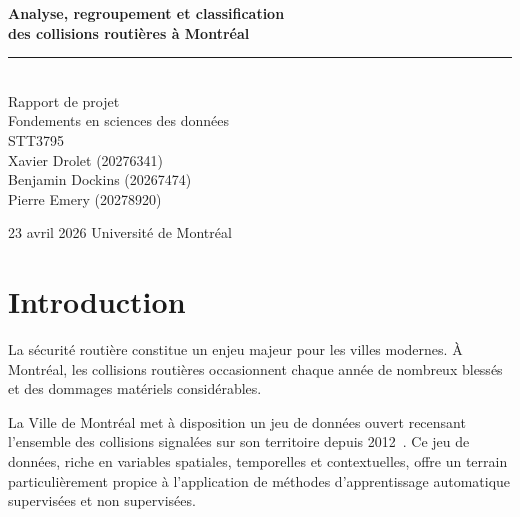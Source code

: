 \documentclass[12pt]{article}
\begin{document}
 
\begin{titlepage}
  \centering
  \vspace*{2cm}
  {\LARGE \textbf{Analyse, regroupement et classification\\
  des collisions routières à Montréal}\\[0.5em]}
  \rule{\linewidth}{0.4pt}\\[1.5em]
  {\large Rapport de projet}\\[1em]
  {\large Fondements en sciences des données}\\[2em]
  {\large  STT3795}\\[2em]

  {\large
  Xavier Drolet (20276341)\\
  Benjamin Dockins (20267474)\\
  Pierre Emery (20278920)\\[2em]}
 
  {\large 23 avril 2026}
  \vfill
  {\large Université de Montréal}
\end{titlepage}
 
\tableofcontents
\newpage
 
\section{Introduction}
 
%
 
La sécurité routière constitue un enjeu majeur pour les villes modernes.
À Montréal, les collisions routières occasionnent chaque année de nombreux
blessés et des dommages matériels considérables.
 
La Ville de Montréal met à disposition un jeu de données ouvert recensant
l'ensemble des collisions signalées sur son territoire depuis 2012~\cite{donnees_mtl}.
Ce jeu de données, riche en variables spatiales, temporelles et contextuelles,
offre un terrain particulièrement propice à l'application de méthodes
d'apprentissage automatique supervisées et non supervisées.
 
\end{document}
